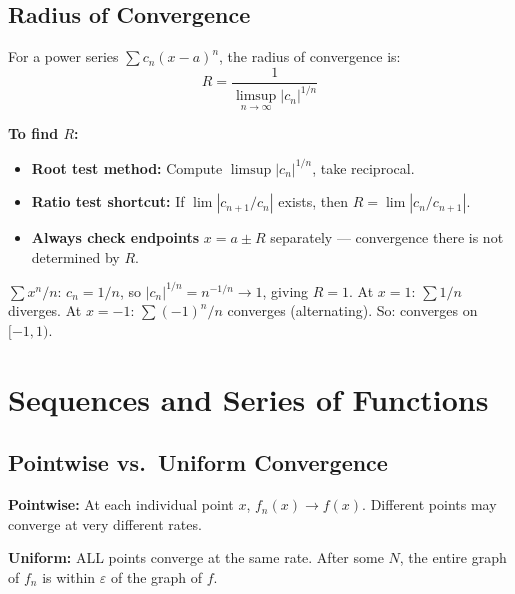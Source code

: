 \documentclass[11pt]{article}
\newcommand{\eps}{\varepsilon}
\theoremstyle{definition}
\begin{document}
\subsection{Radius of Convergence}

For a power series $\sum c_n (x - a)^n$, the radius of convergence is:
$$R = \frac{1}{\limsup_{n \to \infty} |c_n|^{1/n}}$$

\begin{application}
\textbf{To find $R$:}
\begin{itemize}
\item \textbf{Root test method:} Compute $\limsup |c_n|^{1/n}$, take reciprocal.
\item \textbf{Ratio test shortcut:} If $\lim |c_{n+1}/c_n|$ exists, then $R = \lim |c_n / c_{n+1}|$.
\item \textbf{Always check endpoints} $x = a \pm R$ separately --- convergence there is not determined by $R$.
\end{itemize}
\end{application}

\begin{example}
$\sum x^n / n$: $c_n = 1/n$, so $|c_n|^{1/n} = n^{-1/n} \to 1$, giving $R = 1$. At $x = 1$: $\sum 1/n$ diverges. At $x = -1$: $\sum (-1)^n/n$ converges (alternating). So: converges on $[-1, 1)$.
\end{example}

\section{Sequences and Series of Functions}

\subsection{Pointwise vs.\ Uniform Convergence}

\begin{intuition}
\textbf{Pointwise:} At each individual point $x$, $f_n(x) \to f(x)$. Different points may converge at very different rates.

\textbf{Uniform:} ALL points converge at the same rate. After some $N$, the entire graph of $f_n$ is within $\eps$ of the graph of $f$.
\end{intuition}
\end{document}
